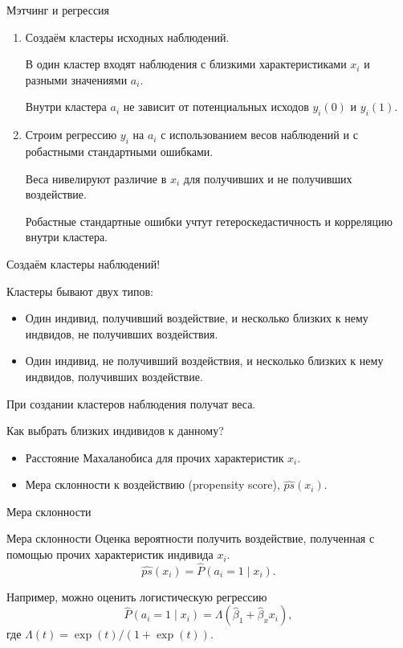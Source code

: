 \begin{frame}{Мэтчинг и регрессия}

  \begin{enumerate}[<+->]
    \item Создаём кластеры исходных наблюдений. 
    
    В один кластер входят наблюдения с \alert{близкими} характеристиками $x_i$
    и разными значениями $a_i$.

    Внутри кластера $a_i$ не зависит от потенциальных исходов $y_i(0)$ и $y_i(1)$.

    \item Строим регрессию $y_i$ на $a_i$ с использованием \alert{весов} наблюдений 
    и с \alert{робастными стандартными ошибками}.

    Веса нивелируют различие в $x_i$ для получивших и не получивших воздействие. 

    Робастные стандартные ошибки учтут гетероскедастичность и 
    корреляцию внутри кластера. 
  \end{enumerate}




\end{frame}


\begin{frame}{Создаём кластеры наблюдений!}

  Кластеры бывают двух типов:
  \begin{itemize}[<+->]
    \item Один индивид, получивший воздействие, и несколько \alert{близких к нему} индвидов, не получивших воздействия. 
    \item Один индивид, не получивший воздействия, и несколько \alert{близких к нему} индвидов, получивших воздействие. 
  \end{itemize}

  При создании кластеров наблюдения получат веса.

  \pause
  Как выбрать близких индивидов к данному?
  \begin{itemize}[<+->]
    \item \alert{Расстояние Махаланобиса} для прочих характеристик $x_i$.
    \item \alert{Мера склонности} к воздействию (propensity score), $\widehat{ps}(x_i)$.
  \end{itemize}

\end{frame}

\begin{frame}{Мера склонности}

\begin{block}{Мера склонности}
Оценка вероятности получить воздействие, полученная с помощью прочих характеристик индивида $x_i$.
\[
\widehat{ps}(x_i) = \hat P(a_i = 1 \mid x_i).
\]
\end{block}
\pause
Например, можно оценить \alert{логистическую регрессию}
\[
  \hat P(a_i = 1 \mid x_i) = \Lambda(\hat\beta_1 + \hat\beta_x x_i),
\]
где $\Lambda(t) = \exp(t)/ (1 + \exp (t))$.

\end{frame}


